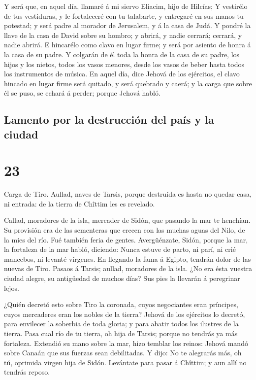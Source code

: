  Y será que, en aquel día, llamaré á mi siervo Eliacim,
hijo de Hilcías;  Y vestirélo de tus vestiduras, y le
fortaleceré con tu talabarte, y entregaré en sus manos tu potestad; y
será padre al morador de Jerusalem, y á la casa de Judá. 
Y pondré la llave de la casa de David sobre su hombro; y abrirá, y nadie
cerrará; cerrará, y nadie abrirá.  E hincarélo como clavo
en lugar firme; y será por asiento de honra á la casa de su padre.
 Y colgarán de él toda la honra de la casa de su padre,
los hijos y los nietos, todos los vasos menores, desde los vasos de
beber hasta todos los instrumentos de música.  En aquel
día, dice Jehová de los ejércitos, el clavo hincado en lugar firme será
quitado, y será quebrado y caerá; y la carga que sobre él se puso, se
echará á perder; porque Jehová habló.

\hypertarget{lamento-por-la-destrucciuxf3n-del-pauxeds-y-la-ciudad}{%
\subsection{Lamento por la destrucción del país y la
ciudad}\label{lamento-por-la-destrucciuxf3n-del-pauxeds-y-la-ciudad}}

\hypertarget{section-22}{%
\section{23}\label{section-22}}

 Carga de Tiro. Aullad, naves de Tarsis, porque destruída
es hasta no quedar casa, ni entrada: de la tierra de Chîttim les es
revelado.

 Callad, moradores de la isla, mercader de Sidón, que
pasando la mar te henchían.  Su provisión era de las
sementeras que crecen con las muchas aguas del Nilo, de la mies del río.
Fué también feria de gentes.  Avergüénzate, Sidón, porque
la mar, la fortaleza de la mar habló, diciendo: Nunca estuve de parto,
ni parí, ni crié mancebos, ni levanté vírgenes.  En
llegando la fama á Egipto, tendrán dolor de las nuevas de Tiro.
 Pasaos á Tarsis; aullad, moradores de la isla.
 ¿No era ésta vuestra ciudad alegre, su antigüedad de
muchos días? Sus pies la llevarán á peregrinar lejos.

 ¿Quién decretó esto sobre Tiro la coronada, cuyos
negociantes eran príncipes, cuyos mercaderes eran los nobles de la
tierra?  Jehová de los ejércitos lo decretó, para
envilecer la soberbia de toda gloria; y para abatir todos los ilustres
de la tierra.  Pasa cual río de tu tierra, oh hija de
Tarsis; porque no tendrás ya más fortaleza.  Extendió su
mano sobre la mar, hizo temblar los reinos: Jehová mandó sobre Canaán
que sus fuerzas sean debilitadas.  Y dijo: No te
alegrarás más, oh tú, oprimida virgen hija de Sidón. Levántate para
pasar á Chîttim; y aun allí no tendrás reposo.

